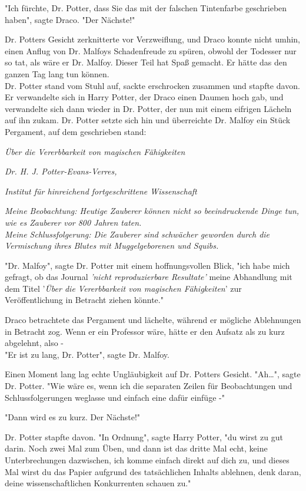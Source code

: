 {"Ich fürchte, Dr. Potter, dass Sie das mit der falschen Tintenfarbe geschrieben haben", sagte Draco. "Der Nächste!"

Dr. Potters Gesicht zerknitterte vor Verzweiflung, und Draco konnte nicht umhin, einen Anflug von Dr. Malfoys Schadenfreude zu spüren, obwohl der Todesser nur so tat, als wäre er Dr. Malfoy. Dieser Teil hat Spaß gemacht. Er hätte das den ganzen Tag lang tun können.\\ Dr. Potter stand vom Stuhl auf, sackte erschrocken zusammen und stapfte davon. Er verwandelte sich in Harry Potter, der Draco einen Daumen hoch gab, und verwandelte sich dann wieder in Dr. Potter, der nun mit einem eifrigen Lächeln auf ihn zukam. Dr. Potter setzte sich hin und überreichte Dr. Malfoy ein Stück Pergament, auf dem geschrieben stand:

\emph{Über die Vererbbarkeit von magischen Fähigkeiten}

\emph{Dr. H. J. Potter-Evans-Verres,}

\emph{Institut für hinreichend fortgeschrittene Wissenschaft}

\emph{Meine Beobachtung: Heutige Zauberer können nicht so beeindruckende Dinge tun, wie es Zauberer vor 800 Jahren taten.}\\ \emph{Meine Schlussfolgerung: Die Zauberer sind schwächer geworden durch die Vermischung ihres Blutes mit Muggelgeborenen und Squibs.}

"Dr. Malfoy", sagte Dr. Potter mit einem hoffnungsvollen Blick, "ich habe mich gefragt, ob das Journal \emph{'nicht reproduzierbare Resultate'} meine Abhandlung mit dem Titel '\emph{Über die Vererbbarkeit von magischen Fähigkeiten}' zur Veröffentlichung in Betracht ziehen könnte."

Draco betrachtete das Pergament und lächelte, während er mögliche Ablehnungen in Betracht zog. Wenn er ein Professor wäre, hätte er den Aufsatz als zu kurz abgelehnt, also -\\ "Er ist zu lang, Dr. Potter", sagte Dr. Malfoy.

Einen Moment lang lag echte Ungläubigkeit auf Dr. Potters Gesicht. "Ah…", sagte Dr. Potter. "Wie wäre es, wenn ich die separaten Zeilen für Beobachtungen und Schlussfolgerungen weglasse und einfach eine dafür einfüge -"

"Dann wird es zu kurz. Der Nächste!"

Dr. Potter stapfte davon. "In Ordnung", sagte Harry Potter, "du wirst zu gut darin. Noch zwei Mal zum Üben, und dann ist das dritte Mal echt, keine Unterbrechungen dazwischen, ich komme einfach direkt auf dich zu, und dieses Mal wirst du das Papier aufgrund des tatsächlichen Inhalts ablehnen, denk daran, deine wissenschaftlichen Konkurrenten schauen zu."

}
